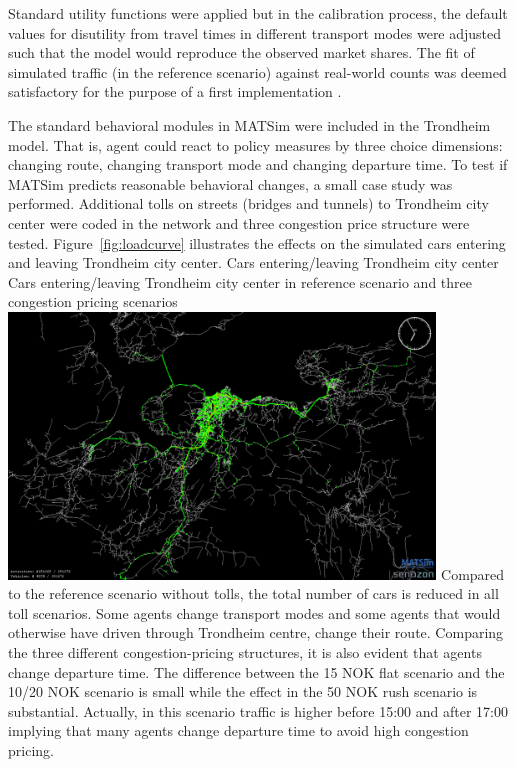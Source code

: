 Standard utility functions were applied but in the calibration process, the default values for disutility from travel times in different transport modes were adjusted such that the model would reproduce the observed market shares. The fit of simulated traffic (in the reference scenario) against real-world counts was deemed satisfactory for the purpose of a first implementation \citep[][]{Bockemuehl_TechRep_UH_2014}. 

The standard behavioral modules in MATSim were included in the Trondheim model. That is, agent could react to policy measures by three choice dimensions: changing route, changing transport mode and changing departure time. To test if MATSim predicts reasonable behavioral changes, a small case study was performed. Additional tolls on streets (bridges and tunnels) to Trondheim city center were coded in the network and three congestion price structure were tested. Figure~\ref{fig:loadcurve} illustrates the effects on the simulated cars entering and leaving Trondheim city center. 
%
\createfigure%
{Cars entering/leaving Trondheim city center}%
{Cars entering/leaving Trondheim city center in reference scenario and three congestion pricing scenarios \citep[source][]{Bockemuehl_TechRep_UH_2014}}%
{\label{fig:loadcurve}}%
{\includegraphics[width=0.85\textwidth, angle=0]{./using/figures/trondheimnetwork.png}}%
{}
%
Compared to the reference scenario without tolls, the total number of cars is reduced in all toll scenarios. Some agents change transport modes and some agents that would otherwise have driven through Trondheim centre, change their route. Comparing the three different congestion-pricing structures, it is also evident that agents change departure time. The difference between the 15 NOK flat scenario and the 10/20 NOK scenario is small while the effect in the 50 NOK rush scenario is substantial. Actually, in this scenario traffic is higher before 15:00 and after 17:00 implying that many agents change departure time to avoid high congestion pricing.  











